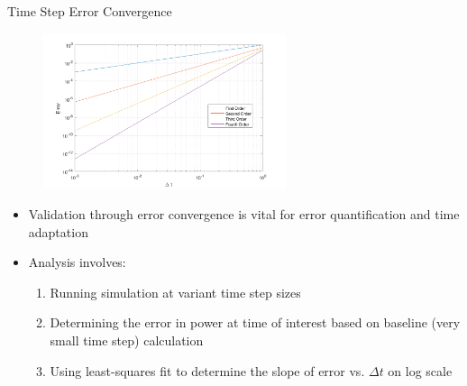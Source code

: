 \documentclass[8pt,xcolor=dvipnames]{beamer}
\begin{document}
\begin{frame}{Time Step Error Convergence}
\vspace{-3mm}

\begin{figure}
\includegraphics[height=1.8in]{figures/gen_conv.png}
\end{figure}
\vspace{-3mm}

\begin{block}{}
\begin{itemize}
\item Validation through error convergence is vital for error quantification and time adaptation
\item Analysis involves:
\begin{enumerate}
\item Running simulation at variant time step sizes
\item Determining the error in power at time of interest based on baseline (very small time step) calculation
\item Using least-squares fit to determine the slope of error vs. $\Delta t$ on log scale
\end{enumerate}
\end{itemize}
\end{block}

\end{frame}
\end{document}
